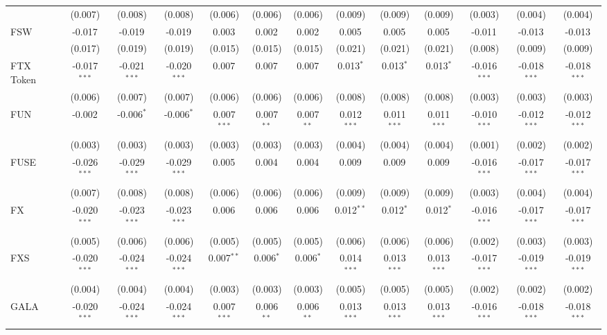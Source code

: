\begin{table}[!htbp]
\begin{tabular}{@{\extracolsep{5pt}}lcccccccccccc}
  & (0.007) & (0.008) & (0.008) & (0.006) & (0.006) & (0.006) & (0.009) & (0.009) & (0.009) & (0.003) & (0.004) & (0.004) \\
 FSW & -0.017$^{}$ & -0.019$^{}$ & -0.019$^{}$ & 0.003$^{}$ & 0.002$^{}$ & 0.002$^{}$ & 0.005$^{}$ & 0.005$^{}$ & 0.005$^{}$ & -0.011$^{}$ & -0.013$^{}$ & -0.013$^{}$ \\
  & (0.017) & (0.019) & (0.019) & (0.015) & (0.015) & (0.015) & (0.021) & (0.021) & (0.021) & (0.008) & (0.009) & (0.009) \\
 FTX Token & -0.017$^{***}$ & -0.021$^{***}$ & -0.020$^{***}$ & 0.007$^{}$ & 0.007$^{}$ & 0.007$^{}$ & 0.013$^{*}$ & 0.013$^{*}$ & 0.013$^{*}$ & -0.016$^{***}$ & -0.018$^{***}$ & -0.018$^{***}$ \\
  & (0.006) & (0.007) & (0.007) & (0.006) & (0.006) & (0.006) & (0.008) & (0.008) & (0.008) & (0.003) & (0.003) & (0.003) \\
 FUN & -0.002$^{}$ & -0.006$^{*}$ & -0.006$^{*}$ & 0.007$^{***}$ & 0.007$^{**}$ & 0.007$^{**}$ & 0.012$^{***}$ & 0.011$^{***}$ & 0.011$^{***}$ & -0.010$^{***}$ & -0.012$^{***}$ & -0.012$^{***}$ \\
  & (0.003) & (0.003) & (0.003) & (0.003) & (0.003) & (0.003) & (0.004) & (0.004) & (0.004) & (0.001) & (0.002) & (0.002) \\
 FUSE & -0.026$^{***}$ & -0.029$^{***}$ & -0.029$^{***}$ & 0.005$^{}$ & 0.004$^{}$ & 0.004$^{}$ & 0.009$^{}$ & 0.009$^{}$ & 0.009$^{}$ & -0.016$^{***}$ & -0.017$^{***}$ & -0.017$^{***}$ \\
  & (0.007) & (0.008) & (0.008) & (0.006) & (0.006) & (0.006) & (0.009) & (0.009) & (0.009) & (0.003) & (0.004) & (0.004) \\
 FX & -0.020$^{***}$ & -0.023$^{***}$ & -0.023$^{***}$ & 0.006$^{}$ & 0.006$^{}$ & 0.006$^{}$ & 0.012$^{**}$ & 0.012$^{*}$ & 0.012$^{*}$ & -0.016$^{***}$ & -0.017$^{***}$ & -0.017$^{***}$ \\
  & (0.005) & (0.006) & (0.006) & (0.005) & (0.005) & (0.005) & (0.006) & (0.006) & (0.006) & (0.002) & (0.003) & (0.003) \\
 FXS & -0.020$^{***}$ & -0.024$^{***}$ & -0.024$^{***}$ & 0.007$^{**}$ & 0.006$^{*}$ & 0.006$^{*}$ & 0.014$^{***}$ & 0.013$^{***}$ & 0.013$^{***}$ & -0.017$^{***}$ & -0.019$^{***}$ & -0.019$^{***}$ \\
  & (0.004) & (0.004) & (0.004) & (0.003) & (0.003) & (0.003) & (0.005) & (0.005) & (0.005) & (0.002) & (0.002) & (0.002) \\
 GALA & -0.020$^{***}$ & -0.024$^{***}$ & -0.024$^{***}$ & 0.007$^{***}$ & 0.006$^{**}$ & 0.006$^{**}$ & 0.013$^{***}$ & 0.013$^{***}$ & 0.013$^{***}$ & -0.016$^{***}$ & -0.018$^{***}$ & -0.018$^{***}$ \\

\end{tabular}
\end{table}
